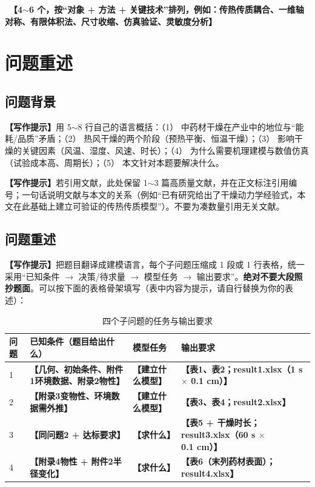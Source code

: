 \documentclass[12pt,a4paper]{article}
\newcommand{\prompt}[1]{\par\noindent\textbf{【写作提示】}#1\par}      %
\newcommand{\ph}[1]{\textbf{【#1】}}                                   %
\begin{document}
\ \ph{4$\sim$6 个，按“对象 + 方法 + 关键技术”排列，例如：传热传质耦合、一维轴对称、有限体积法、尺寸收缩、仿真验证、灵敏度分析}

\clearpage

\section{问题重述}

\subsection{问题背景}

\prompt{用 5$\sim$8 行自己的语言概括：（1） 中药材干燥在产业中的地位与“能耗/品质”矛盾；（2） 热风干燥的两个阶段（预热平衡、恒温干燥）；（3） 影响干燥的关键因素（风温、湿度、风速、时长）；（4） 为什么需要机理建模与数值仿真（试验成本高、周期长）；（5） 本文针对本题要解决什么。}

\prompt{若引用文献，此处保留 1$\sim$3 篇高质量文献，并在正文标注引用编号；一句话说明文献与本文的关系（例如“已有研究给出了干燥动力学经验式，本文在此基础上建立可验证的传热传质模型”）。不要为凑数量引用无关文献。}

\subsection{问题重述}

\prompt{把题目翻译成建模语言，每个子问题压缩成 1 段或 1 行表格，统一采用“已知条件 $\rightarrow$ 决策/待求量 $\rightarrow$ 模型任务 $\rightarrow$ 输出要求”。\textbf{绝对不要大段照抄题面}。可以按下面的表格骨架填写（表中内容为提示，请自行替换为你的表述）：}

\begin{table}[H]
\centering
\caption{四个子问题的任务与输出要求}
\label{tab:restate}
\begin{tabular}{p{1.5cm}p{4.6cm}p{3.6cm}p{4.4cm}}
\toprule
问题 & 已知条件（题目给出什么） & 模型任务 & 输出要求\\
\midrule
1 & \ph{几何、初始条件、附件1环境数据、附录2物性} & \ph{建立什么模型} & \ph{表1、表2；result1.xlsx（1 s $\times$ 0.1 cm）}\\
\midrule
2 & \ph{附录3变物性、环境数据需外推} & \ph{建立什么模型} & \ph{表3、表4；result2.xlsx}\\
\midrule
3 & \ph{同问题2 + 达标要求} & \ph{求什么} & \ph{表5 + 干燥时长；result3.xlsx（60 s $\times$ 0.1 cm）}\\
\midrule
4 & \ph{附录4物性 + 附件2半径变化} & \ph{求什么} & \ph{表6（末列药材表面）；result4.xlsx}\\
\bottomrule
\end{tabular}
\end{table}
\end{document}
